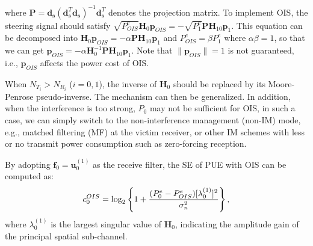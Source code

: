 \documentclass[10pt, conference, letterpaper]{IEEEtran}
\begin{document}
where $\mathbf{P}=\mathbf{d}_{\mathbf{s}}(\mathbf{d}^{T}_{\mathbf{s}}\mathbf{d}_{\mathbf{s}})^{-1}
\mathbf{d}^{T}_{\mathbf{s}}$ denotes the projection matrix.
To implement OIS, the steering signal should satisfy
$\sqrt{P^{e}_{OIS}}\mathbf{H}_{0}\mathbf{p}_{OIS}=-\sqrt{P^{e}_{1}}\mathbf{P}\mathbf{H}_{10}\mathbf{p}_{1}$.
This equation can be decomposed into
$\mathbf{H}_{0}\mathbf{p}_{OIS}=-\alpha\mathbf{P}\mathbf{H}_{10}\mathbf{p}_{1}$ and
$P^{e}_{OIS}=\beta P^{e}_{1}$ where $\alpha\beta=1$,
so that we can get $\mathbf{p}_{OIS}=-\alpha\mathbf{H}^{-1}_{0}\mathbf{P}\mathbf{H}_{10}\mathbf{p}_{1}$.
Note that $\|\mathbf{p}_{OIS}\|=1$ is not guaranteed,
i.e., $\mathbf{p}_{OIS}$ affects the power cost of OIS.

When $N_{T_{i}}>N_{R_{i}}$ ($i=0,1$), the inverse of $\mathbf{H}_{0}$ should be
replaced by its Moore-Penrose pseudo-inverse. The mechanism can then be generalized.
In addition, when the interference is too strong, $P_0$ may not be sufficient for OIS,
in such a case, we can simply switch to the non-interference management (non-IM) mode,
e.g., matched filtering (MF) at the victim receiver,
or other IM schemes with less or no transmit power consumption such as zero-forcing reception.

By adopting $\mathbf{f}_{0}=\mathbf{u}^{(1)}_{0}$ as the receive filter,
the SE of PUE with OIS can be computed as:
\begin{equation}
\vspace*{-0.05in}
\setcounter{equation}{3}
c^{OIS}_{0}=\log_{2}\left\{
1+\frac{(P^{e}_{0}-P^{e}_{OIS})[\lambda^{(1)}_{0}]^{2}}
{\sigma^{2}_{n}}
\right\},
\end{equation}
where $\lambda^{(1)}_{0}$ is the largest singular value of $\mathbf{H}_{0}$,
indicating the amplitude gain of the principal spatial sub-channel.
\end{document}
